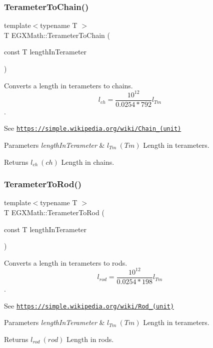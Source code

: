 \subsubsection{\texorpdfstring{Terameter\+To\+Chain()}{TerameterToChain()}}
{\footnotesize\ttfamily template$<$typename T $>$ \\
T E\+G\+X\+Math\+::\+Terameter\+To\+Chain (\begin{DoxyParamCaption}\item[{const T}]{length\+In\+Terameter }\end{DoxyParamCaption})}



Converts a length in terameters to chains. \[ l_{ch}= \frac{10^{12}}{0.0254 * 792} l_{Tm} \]. 

See \href{https://simple.wikipedia.org/wiki/Chain_(unit)}{\tt https\+://simple.\+wikipedia.\+org/wiki/\+Chain\+\_\+(unit)} 
\begin{DoxyParams}{Parameters}
{\em length\+In\+Terameter} & $ l_{Tm}\ (Tm)$ Length in terameters. \\
\hline
\end{DoxyParams}
\begin{DoxyReturn}{Returns}
$ l_{ch}\ (ch)$ Length in chains. 
\end{DoxyReturn}
\mbox{\label{group___e_g_x_math-_conversions-_length_conversions-_s_i-_terameter-_surveyors_gaa3d08b1f4809bc73a7194ab85c849737}} 
\subsubsection{\texorpdfstring{Terameter\+To\+Rod()}{TerameterToRod()}}
{\footnotesize\ttfamily template$<$typename T $>$ \\
T E\+G\+X\+Math\+::\+Terameter\+To\+Rod (\begin{DoxyParamCaption}\item[{const T}]{length\+In\+Terameter }\end{DoxyParamCaption})}



Converts a length in terameters to rods. \[ l_{rod}= \frac{10^{12}}{0.0254 * 198} l_{Tm} \]. 

See \href{https://simple.wikipedia.org/wiki/Rod_(unit)}{\tt https\+://simple.\+wikipedia.\+org/wiki/\+Rod\+\_\+(unit)} 
\begin{DoxyParams}{Parameters}
{\em length\+In\+Terameter} & $ l_{Tm}\ (Tm)$ Length in terameters. \\
\hline
\end{DoxyParams}
\begin{DoxyReturn}{Returns}
$ l_{rod}\ (rod)$ Length in rods. 
\end{DoxyReturn}
